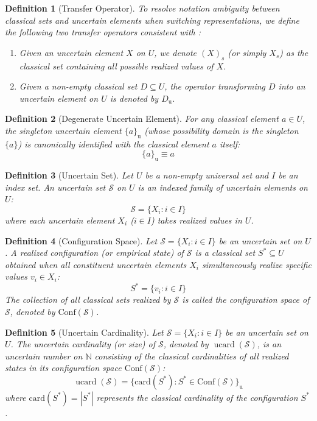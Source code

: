 \documentclass[a4paper,12pt, twoside]{memoir}
\newtheorem{definition}{Definition}[chapter]
\DeclareMathOperator{\UCARD}{ucard}
\newcommand{\tbd}[1]{\mathcal{#1}} %
\newcommand{\s}[1]{\{#1\}_\mathrm{u}} %
\newcommand{\kbd}[1]{{#1}_\mathrm{u}} %
\begin{document}
	\begin{definition}[Transfer Operator]
		To resolve notation ambiguity between classical sets and uncertain elements when switching representations, we define the following two transfer operators consistent with \cite{tran2026extended}:
		\begin{enumerate}[leftmargin=*]
			\item Given an uncertain element $X$ on $U$, we denote $(X)_s$ (or simply $X_s$) as the classical set containing all possible realized values of $X$.
			\item Given a non-empty classical set $D \subseteq U$, the operator transforming $D$ into an uncertain element on $U$ is denoted by $\kbd{D}$.
		\end{enumerate}
	\end{definition}
	
	\begin{definition}[Degenerate Uncertain Element]
		For any classical element $a \in U$, the singleton uncertain element $\s{a}$ (whose possibility domain is the singleton $\{a\}$) is canonically identified with the classical element $a$ itself:
		\[
		\s{a} \equiv a
		\]
	\end{definition}
	
	\begin{definition}[Uncertain Set]
		Let $U$ be a non-empty universal set and $I$ be an index set. An uncertain set $\tbd{S}$ on $U$ is an indexed family of uncertain elements on $U$:
		\[
		\tbd{S} = \{X_i : i \in I\}
		\]
		where each uncertain element $X_i$ ($i \in I$) takes realized values in $U$.
	\end{definition}
	
	\begin{definition}[Configuration Space]
		Let $\tbd{S} = \{X_i : i \in I\}$ be an uncertain set on $U$. A realized configuration (or empirical state) of $\tbd{S}$ is a classical set $S^* \subseteq U$ obtained when all constituent uncertain elements $X_i$ simultaneously realize specific values $v_i \in X_i$:
		\[
		S^* = \{v_i : i \in I\}
		\]
		The collection of all classical sets realized by $\tbd{S}$ is called the configuration space of $\tbd{S}$, denoted by $\mathrm{Conf}(\tbd{S})$.
	\end{definition}
	
	\begin{definition}[Uncertain Cardinality]
		Let $\tbd{S} = \{X_i : i \in I\}$ be an uncertain set on $U$. The uncertain cardinality (or size) of $\tbd{S}$, denoted by $\UCARD(\tbd{S})$, is an uncertain number on $\mathbb{N}$ consisting of the classical cardinalities of all realized states in its configuration space $\mathrm{Conf}(\tbd{S})$:
		\[
		\UCARD(\tbd{S}) = \s{ \mathrm{card}(S^*) : S^* \in \mathrm{Conf}(\tbd{S}) }
		\]
		where $\mathrm{card}(S^*) = |S^*|$ represents the classical cardinality of the configuration $S^*$.
	\end{definition}
	
\end{document}
